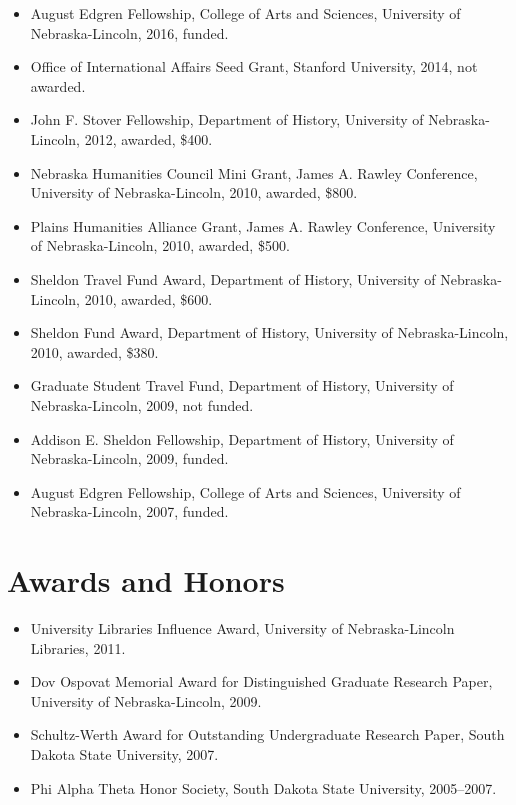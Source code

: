 \begin{itemize}
\tightlist
\item
  August Edgren Fellowship, College of Arts and Sciences, University of
  Nebraska-Lincoln, 2016, funded.
\item
  Office of International Affairs Seed Grant, Stanford University, 2014,
  not awarded.
\item
  John F. Stover Fellowship, Department of History, University of
  Nebraska-Lincoln, 2012, awarded, \$400.
\item
  Nebraska Humanities Council Mini Grant, James A. Rawley Conference,
  University of Nebraska-Lincoln, 2010, awarded, \$800.
\item
  Plains Humanities Alliance Grant, James A. Rawley Conference,
  University of Nebraska-Lincoln, 2010, awarded, \$500.
\item
  Sheldon Travel Fund Award, Department of History, University of
  Nebraska-Lincoln, 2010, awarded, \$600.
\item
  Sheldon Fund Award, Department of History, University of
  Nebraska-Lincoln, 2010, awarded, \$380.
\item
  Graduate Student Travel Fund, Department of History, University of
  Nebraska-Lincoln, 2009, not funded.
\item
  Addison E. Sheldon Fellowship, Department of History, University of
  Nebraska-Lincoln, 2009, funded.
\item
  August Edgren Fellowship, College of Arts and Sciences, University of
  Nebraska-Lincoln, 2007, funded.
\end{itemize}

\section{Awards and Honors}\label{awards-and-honors}

\begin{itemize}
\tightlist
\item
  University Libraries Influence Award, University of Nebraska-Lincoln
  Libraries, 2011.
\item
  Dov Ospovat Memorial Award for Distinguished Graduate Research Paper,
  University of Nebraska-Lincoln, 2009.
\item
  Schultz-Werth Award for Outstanding Undergraduate Research Paper,
  South Dakota State University, 2007.
\item
  Phi Alpha Theta Honor Society, South Dakota State University,
  2005--2007.
\end{itemize}

